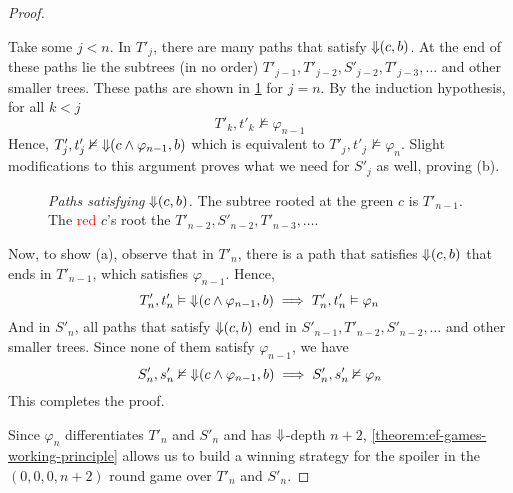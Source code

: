 \documentclass[a4paper,UKenglish,cleveref, autoref, thm-restate, numberwithinsect]{lipics-v2021}
\def\Darrow{\ensuremath\mathord{\Downarrow}}
\begin{document}
\begin{proof}
\begin{claimproof}
\begin{description}
                Take some $j < n$. In $T'_j$, there are many paths that satisfy $\Darrow(c, b)$. At the end of these paths lie the subtrees (in no order) $T'_{j-1}, T'_{j - 2}, S'_{j - 2}, T'_{j - 3}, \ldots$ and other smaller trees. These paths are shown in \cref{efFinalProofStep1} for $j = n$. By the induction hypothesis, for all $k < j$
                \begin{equation*}
                        T'_k, t'_k \nvDash \varphi_{n - 1}
                \end{equation*}
                Hence, $T'_j, t'_j \nvDash \Darrow(c \land \varphi_{n - 1}, b)$ which is equivalent to  $T'_j, t'_j \nvDash \varphi_n$. Slight modifications to this argument proves what we need for $S'_j$ as well, proving (b).
                \begin{figure}[h]
                    \centering
                    \caption{\emph{Paths satisfying $\Darrow(c, b)$.} The subtree rooted at the \textcolor{OliveGreen}{green} $c$ is $T'_{n - 1}$. The \textcolor{red}{red} $c$'s root the $T'_{n - 2}, S'_{n - 2}, T'_{n-3}, \ldots$.}
                    \label{efFinalProofStep1}
                \end{figure}

                Now, to show (a), observe that in $T'_n$, there is a path that satisfies $\Darrow(c, b)$ that ends in $T'_{n - 1}$, which satisfies $\varphi_{n-1}$. Hence,
                \begin{equation*}
                    T'_n, t'_n \vDash \Darrow(c \land \varphi_{n-1}, b) \implies T'_n, t'_n \vDash \varphi_n
                \end{equation*}
                And in $S'_n$, all paths that satisfy $\Darrow(c, b)$ end in $S'_{n - 1}, T'_{n -2}, S'_{n - 2}, \ldots$ and other smaller trees. Since none of them satisfy $\varphi_{n-1}$, we have
                \begin{equation*}
                    S'_n, s'_n \nvDash \Darrow(c \land \varphi_{n-1}, b) \implies S'_n, s'_n \nvDash \varphi_n
                \end{equation*}
                This completes the proof.
        \end{description}
    \end{claimproof}
    Since $\varphi_n$ differentiates $T'_n$ and $S'_n$ and has $\Darrow$-depth $n+2$, \cref{theorem:ef-games-working-principle} allows us to build a winning strategy for the spoiler in the $(0, 0, 0, n+2)$ round game over $T'_n$ and $S'_n$.


\end{proof}
\end{document}

